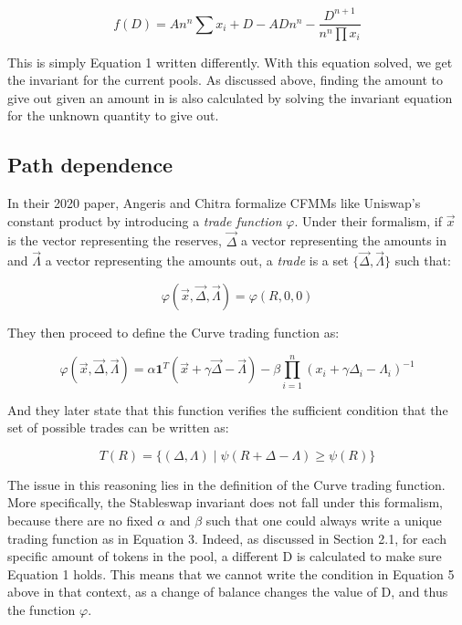 \documentclass{article}
\begin{document}
    \begin{equation}
        f(D) = A n^{n} \sum x_{i}+D - A D n^{n} -\frac{D^{n+1}}{n^{n} \prod x_{i}}
    \end{equation}

    This is simply Equation 1 written differently. With this equation solved, we get the invariant for the current pools. As discussed above, finding the amount to give out given an amount in is also calculated by solving the invariant equation for the unknown quantity to give out. 

    \subsection{Path dependence}

    In their 2020 paper, Angeris and Chitra formalize CFMMs like Uniswap's constant product by introducing a \textit{trade function} $\varphi$. Under their formalism, if $\vec{x}$ is the vector representing the reserves, $\vec{\Delta}$ a vector representing the amounts in and $\vec{\Lambda}$ a vector representing the amounts out, a \textit{trade} is a set $\{\vec{\Delta}, \vec{\Lambda}\}$ such that:

    \begin{equation}
        \varphi(\vec{x}, \vec{\Delta}, \vec{\Lambda}) = \varphi(R, 0,0)
    \end{equation}

    They then proceed to define the Curve trading function as: 

    \begin{equation}
        \varphi(\vec{x}, \vec{\Delta}, \vec{\Lambda})=\alpha \mathbf{1}^{T}(\vec{x}+\gamma \vec{\Delta}-\vec{\Lambda})-\beta \prod_{i=1}^{n}\left(x_{i}+\gamma \Delta_{i}-\Lambda_{i}\right)^{-1}
    \end{equation}

    And they later state that this function verifies the sufficient condition that the set of possible trades can be written as: 

    \begin{equation}
        T(R)=\{(\Delta, \Lambda) \mid \psi(R+\Delta-\Lambda) \geq \psi(R)\}
    \end{equation}

    The issue in this reasoning lies in the definition of the Curve trading function. More specifically, the Stableswap invariant does not fall under this formalism, because there are no fixed $\alpha$ and $\beta$ such that one could always write a unique trading function as in Equation 3. Indeed, as discussed in Section 2.1, for each specific amount of tokens in the pool, a different D is calculated to make sure Equation 1 holds. This means that we cannot write the condition in Equation 5 above in that context, as a change of balance changes the value of D, and thus the function $\varphi$. 
\end{document}
